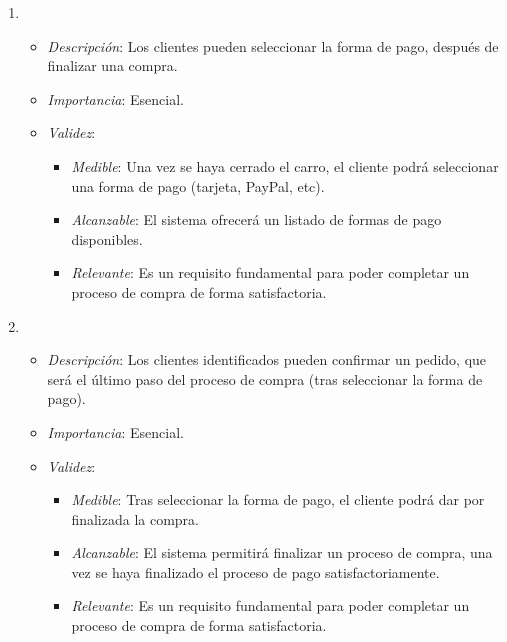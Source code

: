 \begin{enumerate}[{\bf RF-1}]
\item 
  \begin{itemize}
  \item \textit{Descripción}: Los clientes pueden seleccionar la forma de pago, después de finalizar una compra.
  \item \textit{Importancia}: Esencial.
  \item \textit{Validez}:
    \begin{itemize}
    \item \textit{Medible}: Una vez se haya cerrado el carro, el cliente podrá seleccionar una forma de pago (tarjeta, PayPal, etc).
    \item \textit{Alcanzable}: El sistema ofrecerá un listado de formas de pago disponibles.
    \item \textit{Relevante}: Es un requisito fundamental para poder completar un proceso de compra de forma satisfactoria.
    \end{itemize}
  \end{itemize}

\item 
  \begin{itemize}
  \item \textit{Descripción}: Los clientes identificados pueden confirmar un pedido, que será el último paso del proceso de compra (tras seleccionar la forma de pago).
  \item \textit{Importancia}: Esencial.
  \item \textit{Validez}:
    \begin{itemize}
    \item \textit{Medible}: Tras seleccionar la forma de pago, el cliente podrá dar por finalizada la compra.
    \item \textit{Alcanzable}: El sistema permitirá finalizar un proceso de compra, una vez se haya finalizado el proceso de pago satisfactoriamente.
    \item \textit{Relevante}: Es un requisito fundamental para poder completar un proceso de compra de forma satisfactoria.
    \end{itemize}
  \end{itemize}


\end{enumerate}
